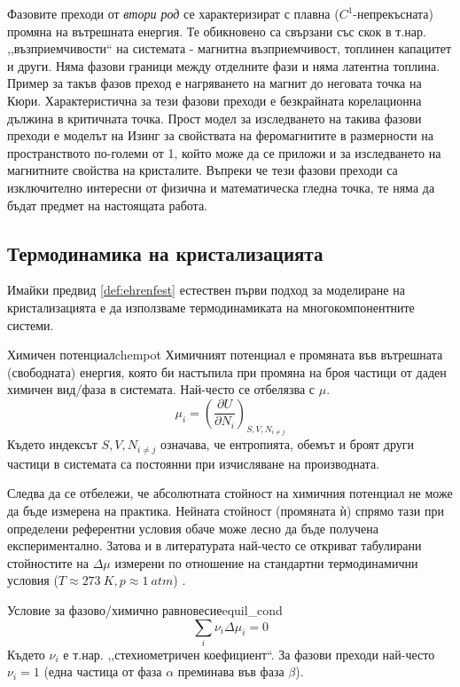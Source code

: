 Фазовите преходи от \textit{втори род} се характеризират с плавна ($C^1$-непрекъсната) промяна на вътрешната енергия. Те обикновено са свързани със скок в т.нар. ,,възприемчивости`` на системата - магнитна възприемчивост, топлинен капацитет и други. Няма фазови граници между отделните фази и няма латентна топлина. Пример за такъв фазов преход е нагряването на магнит до неговата точка на Кюри. Характеристична за тези фазови преходи е безкрайната корелационна дължина в критичната точка. Прост модел за изследването на такива фазови преходи е моделът на Изинг за свойствата на феромагнитите в размерности на пространството по-големи от 1, който може да се приложи и за изследването на магнитните свойства на кристалите. Въпреки че тези фазови преходи са изключително интересни от физична и математическа гледна точка, те няма да бъдат предмет на настоящата работа.

\subsection{Термодинамика на кристализацията}
\label{sub:thermodynamics}
Имайки предвид \autoref{def:ehrenfest} естествен първи подход за моделиране на кристализацията е да използваме термодинамиката на многокомпонентните системи.

\begin{definition}{Химичен потенциал}{chempot}
    Химичният потенциал е промяната във вътрешната (свободната) енергия, която би настъпила при промяна на броя частици от даден химичен вид/фаза в системата. Най-често се отбелязва с $\mu$.
	\begin{equation}
		\label{eq:chempot}
		\mu_i = \left(\frac{\partial U}{\partial N_i}\right)_{S, V, N_{i \ne j}}
	\end{equation}
	Където индексът $S, V, N_{i \ne j}$ означава, че ентропията, обемът и броят други частици в системата са постоянни при изчисляване на производната.
\end{definition}

\noindent Следва да се отбележи, че абсолютната стойност на химичния потенциал не може да бъде измерена на практика. Нейната стойност (промяната ѝ) спрямо тази при определени референтни условия обаче може лесно да бъде получена експериментално. Затова и в литературата най-често се откриват табулирани стойностите на $\Delta \mu$ измерени по отношение на стандартни термодинамични условия ($T \approx 273~K, p \approx 1~atm$) \cite{IvanMarkovCGB}\cite{atkinspaula2008}.

\begin{result}{Условие за фазово/химично равновесие}{equil_cond}
	\[\sum\limits_i \nu_i\Delta \mu_i  = 0\]
	Където $\nu_i$ е т.нар. ,,стехиометричен коефициент``. За фазови преходи най-често $\nu_i = 1$ (една частица от фаза $\alpha$ преминава във фаза $\beta$).
\end{result}

